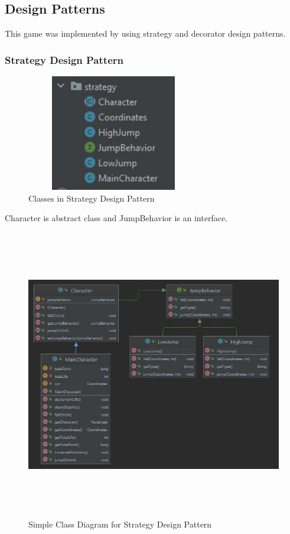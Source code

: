 \documentclass{article}
\begin{document}
\subsection{Design Patterns}
This game was implemented by using strategy and decorator design patterns.
\subsubsection{Strategy Design Pattern}
\begin{figure}[H]
    \centering
	\includegraphics[width=3in, height=2in]{t2.JPG}
	\caption[Optional caption]{Classes in Strategy Design Pattern}
	\label{}
\end{figure}
Character is abstract class and JumpBehavior is an interface. 
\begin{figure}[H]
    \centering
	\includegraphics[width=7in, height=5in]{t3.JPG}
	\caption[Optional caption]{Simple Class Diagram for Strategy Design Pattern}
	\label{}
\end{figure}
\end{document}
